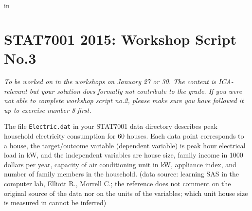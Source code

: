 
\topmargin   -3cm
\textwidth   6.2in
 in



\section*{STAT7001 2015: Workshop Script No.3}
{\em To be worked on in the workshops on January 27 or 30. The content is ICA-relevant but your solution does formally not contribute to the grade. If you were not able to complete workshop script no.2, please make sure you have followed it up to exercise number 8 first.}


The file {\tt Electric.dat} in your STAT7001 data directory describes peak household electricity consumption for 60 houses. Each data point corresponds to a house, the target/outcome variable (dependent variable) is peak hour electrical load in kW, and the independent variables are house size, family income in 1000 dollars per year, capacity of air conditioning unit in kW, appliance index, and number of family members in the household.
(data source: learning SAS in the computer lab, Elliott R., Morrell C.; the reference does not comment on the original source of the data nor on the units of the variables; which unit house size is measured in cannot be inferred)


